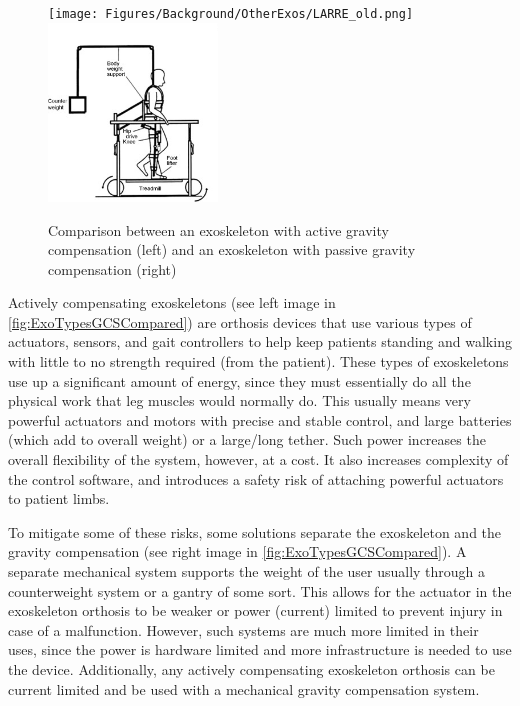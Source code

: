 \begin{figure}[ht!]
    \centering
    \texttt{[image: Figures/Background/OtherExos/LARRE\_old.png]}
    \hspace*{10mm}
    \includegraphics[width=0.4\textwidth]{Figures/Background/ExoSeparateGravityComp.png}
    \caption{Comparison between an exoskeleton with active gravity compensation (left) and an exoskeleton with passive gravity compensation (right) \cite{GaitTrainingClinical}}
    \label{fig:ExoTypesGCSCompared}
\end{figure}

Actively compensating exoskeletons (see left image in \autoref{fig:ExoTypesGCSCompared}) are orthosis devices that use various types of actuators, sensors, and gait controllers to help keep patients standing and walking with little to no strength required (from the patient). These types of exoskeletons use up a significant amount of energy, since they must essentially do all the physical work that leg muscles would normally do. This usually means very powerful actuators and motors with precise and stable control, and large batteries (which add to overall weight) or a large/long tether. Such power increases the overall flexibility of the system, however, at a cost. It also increases complexity of the control software, and introduces a safety risk of attaching powerful actuators to patient limbs.

To mitigate some of these risks, some solutions separate the exoskeleton and the gravity compensation (see right image in \autoref{fig:ExoTypesGCSCompared}). A separate mechanical system supports the weight of the user usually through a counterweight system or a gantry of some sort. This allows for the actuator in the exoskeleton orthosis to be weaker or power (current) limited to prevent injury in case of a malfunction. However, such systems are much more limited in their uses, since the power is hardware limited and more infrastructure is needed to use the device. Additionally, any actively compensating exoskeleton orthosis can be current limited and be used with a mechanical gravity compensation system. 

